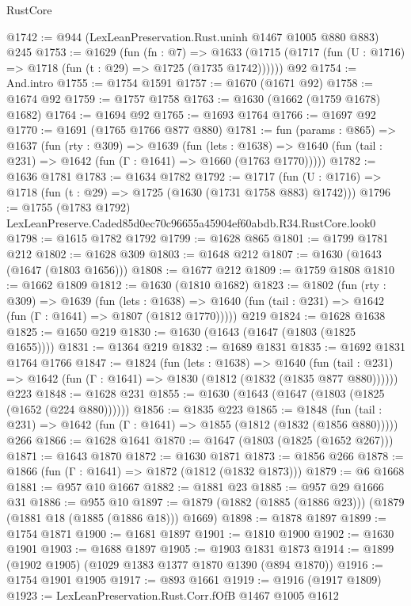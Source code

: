 \begin{lexlean}{RustCore}
\begin{coremodule}
@1742 := @944 (LexLeanPreservation.Rust.uninh @1467 @1005 @880 @883) @245
@1753 := @1629
    (fun (fn : @7) =>
    @1633 (@1715 (@1717 (fun (U : @1716) => @1718 (fun (t : @29) => @1725 (@1735 @1742))))))
    @92
@1754 := And.intro
@1755 := @1754 @1591
@1757 := @1670 (@1671 @92)
@1758 := @1674 @92
@1759 := @1757 @1758
@1763 := @1630 (@1662 (@1759 @1678) @1682)
@1764 := @1694 @92
@1765 := @1693 @1764
@1766 := @1697 @92
@1770 := @1691 (@1765 @1766 @877 @880)
@1781 := fun (params : @865) =>
  @1637
    (fun (rty : @309) =>
    @1639
      (fun (lets : @1638) =>
      @1640 (fun (tail : @231) => @1642 (fun (Γ : @1641) => @1660 (@1763 @1770)))))
@1782 := @1636 @1781
@1783 := @1634 @1782
@1792 := @1717 (fun (U : @1716) => @1718 (fun (t : @29) => @1725 (@1630 (@1731 @1758 @883) @1742)))
@1796 := @1755 (@1783 @1792) LexLeanPreserve.Caded85d0ec70c96655a45904ef60abdb.R34.RustCore.look0
@1798 := @1615 @1782 @1792
@1799 := @1628 @865
@1801 := @1799 @1781 @212
@1802 := @1628 @309
@1803 := @1648 @212
@1807 := @1630 (@1643 (@1647 (@1803 @1656)))
@1808 := @1677 @212
@1809 := @1759 @1808
@1810 := @1662 @1809
@1812 := @1630 (@1810 @1682)
@1823 := @1802
    (fun (rty : @309) =>
    @1639
      (fun (lets : @1638) =>
      @1640 (fun (tail : @231) => @1642 (fun (Γ : @1641) => @1807 (@1812 @1770)))))
    @219
@1824 := @1628 @1638
@1825 := @1650 @219
@1830 := @1630 (@1643 (@1647 (@1803 (@1825 @1655))))
@1831 := @1364 @219
@1832 := @1689 @1831
@1835 := @1692 @1831 @1764 @1766
@1847 := @1824
    (fun (lets : @1638) =>
    @1640 (fun (tail : @231) => @1642 (fun (Γ : @1641) => @1830 (@1812 (@1832 (@1835 @877 @880))))))
    @223
@1848 := @1628 @231
@1855 := @1630 (@1643 (@1647 (@1803 (@1825 (@1652 (@224 @880))))))
@1856 := @1835 @223
@1865 := @1848
    (fun (tail : @231) => @1642 (fun (Γ : @1641) => @1855 (@1812 (@1832 (@1856 @880)))))
    @266
@1866 := @1628 @1641
@1870 := @1647 (@1803 (@1825 (@1652 @267)))
@1871 := @1643 @1870
@1872 := @1630 @1871
@1873 := @1856 @266
@1878 := @1866 (fun (Γ : @1641) => @1872 (@1812 (@1832 @1873)))
@1879 := @6 @1668
@1881 := @957 @10 @1667
@1882 := @1881 @23
@1885 := @957 @29 @1666 @31
@1886 := @955 @10
@1897 := @1879 (@1882 (@1885 (@1886 @23))) (@1879 (@1881 @18 (@1885 (@1886 @18))) @1669)
@1898 := @1878 @1897
@1899 := @1754 @1871
@1900 := @1681 @1897
@1901 := @1810 @1900
@1902 := @1630 @1901
@1903 := @1688 @1897
@1905 := @1903 @1831 @1873
@1914 := @1899 (@1902 @1905) (@1029 @1383 @1377 @1870 @1390 (@894 @1870))
@1916 := @1754 @1901 @1905
@1917 := @893 @1661
@1919 := @1916 (@1917 @1809)
@1923 := LexLeanPreservation.Rust.Corr.fOfB @1467 @1005 @1612

\end{coremodule}
\end{lexlean}
